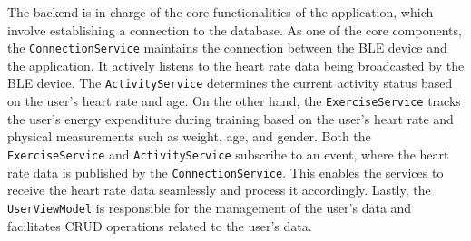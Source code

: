 The backend is in charge of the core functionalities of the application, which involve establishing a connection to the database.
As one of the core components, the \texttt{ConnectionService} maintains the connection between the BLE device and the application. It actively listens to the heart rate data being broadcasted by the BLE device. 
The \texttt{ActivityService} determines the current activity status based on the user's heart rate and age. 
On the other hand, the \texttt{ExerciseService} tracks the user's energy expenditure during training based on the user's heart rate and physical measurements such as weight, age, and gender. Both the \texttt{ExerciseService} and \texttt{ActivityService} subscribe to an event, where the heart rate data is published by the \texttt{ConnectionService}. This enables the services to receive the heart rate data seamlessly and process it accordingly.
Lastly, the \texttt{UserViewModel} is responsible for the management of the user's data and facilitates CRUD operations related to the user's data.
